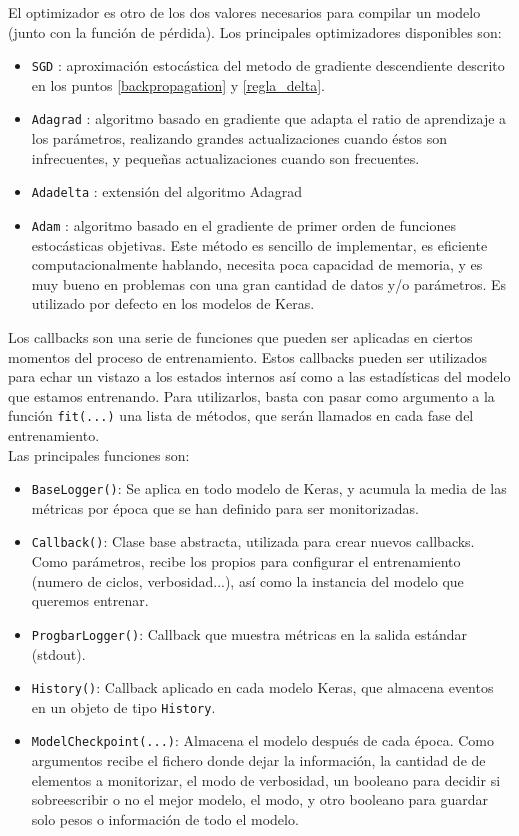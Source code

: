 El optimizador es otro de los dos valores necesarios para compilar un modelo (junto con la función de pérdida). Los principales optimizadores disponibles son:
\begin{itemize}[noitemsep]
\item \lstinline{SGD} : aproximación estocástica del metodo de gradiente descendiente descrito en los puntos \ref{backpropagation} y \ref{regla_delta}.
\item \lstinline{Adagrad} : algoritmo basado en gradiente que adapta el ratio de aprendizaje a los parámetros, realizando grandes actualizaciones cuando éstos son infrecuentes, y pequeñas actualizaciones cuando son frecuentes.
\item \lstinline{Adadelta} : extensión del algoritmo Adagrad
\item \lstinline{Adam} : algoritmo basado en el gradiente de primer orden de funciones estocásticas objetivas. Este método es sencillo de implementar, es eficiente computacionalmente hablando, necesita poca capacidad de memoria, y es muy bueno en problemas con una gran cantidad de datos y/o parámetros. Es utilizado por defecto en los modelos de Keras.
\end{itemize}

Los callbacks son una serie de funciones que pueden ser aplicadas en ciertos momentos del proceso de entrenamiento. Estos callbacks pueden ser utilizados para echar un vistazo a los estados internos así como a las estadísticas del modelo que estamos entrenando. Para utilizarlos, basta con pasar como argumento a la función \lstinline{fit(...)} una lista de métodos, que serán llamados en cada fase del entrenamiento.\\
Las principales funciones son:
\begin{itemize}
\item \lstinline{BaseLogger()}: Se aplica en todo modelo de Keras, y acumula la media de las métricas por época que se han definido para ser monitorizadas.
\item \lstinline{Callback()}: Clase base abstracta, utilizada para crear nuevos callbacks. Como parámetros, recibe los propios para configurar el entrenamiento (numero de ciclos, verbosidad...), así como la instancia del modelo que queremos entrenar.
\item \lstinline{ProgbarLogger()}: Callback que muestra métricas en la salida estándar (stdout).
\item \lstinline{History()}: Callback aplicado en cada modelo Keras, que almacena eventos en un objeto de tipo \lstinline{History}.
\item \lstinline{ModelCheckpoint(...)}: Almacena el modelo después de cada época. Como argumentos recibe el fichero donde dejar la información, la cantidad de de elementos a monitorizar, el modo de verbosidad, un booleano para decidir si sobreescribir o no el mejor modelo, el modo, y otro booleano para guardar solo pesos o información de todo el modelo.
\end{itemize}

